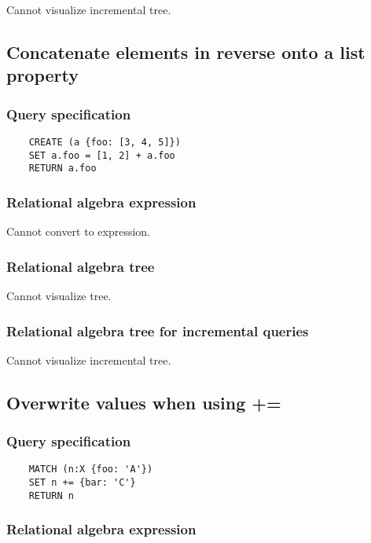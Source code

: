 	Cannot visualize incremental tree.
	\subsection{Concatenate elements in reverse onto a list property}

	\subsubsection*{Query specification}

	\begin{lstlisting}
	CREATE (a {foo: [3, 4, 5]})
	SET a.foo = [1, 2] + a.foo
	RETURN a.foo
	\end{lstlisting}


	\subsubsection*{Relational algebra expression}

	Cannot convert to expression.

	\subsubsection*{Relational algebra tree}

	Cannot visualize tree.

	\subsubsection*{Relational algebra tree for incremental queries}

	Cannot visualize incremental tree.
	\subsection{Overwrite values when using +=}

	\subsubsection*{Query specification}

	\begin{lstlisting}
	MATCH (n:X {foo: 'A'})
	SET n += {bar: 'C'}
	RETURN n
	\end{lstlisting}


	\subsubsection*{Relational algebra expression}


